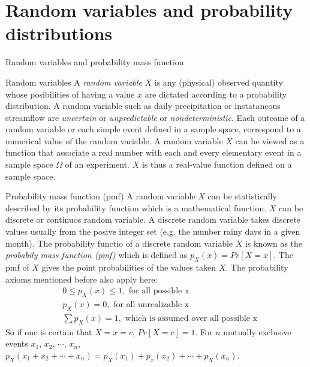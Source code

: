 \documentclass[8pt]{beamer}
\begin{document}
\section{Random variables and probability distributions}
\begin{frame}{Random variables and probability mass function}
    \begin{block}{Random variables}
        A \emph{random variable} $X$ is any (physical) observed quantity whose posibilities of having a value $x$ are dictated according to a probability distribution. A random variable such as daily precipitation or instataneous streamflow are \emph{uncertain} or \emph{unpredictable} or \emph{nondeterministic}. Each outcome of a random variable or each simple event defined in a sample space, correspond to a numerical value of the random variable. A random variable $X$ can be viewed as a function that associate a real number with each and every elementary event in a sample space $\Omega$ of an experiment. $X$ is thus a real-value function defined on a sample space.  
    \end{block}
    
    \begin{block}{Probability mass function (pmf)}
        A random variable $X$ can be statistically described by its probability function which is a mathematical function. $X$ can be discrete or continuos random variable. A discrete random variable takes discrete values usually from the posive integer set (e.g. the number rainy days in a given month). The probability functio of a discrete random variable $X$ is known as the \emph{probabily mass function (pmf)} which is defined as $p_X (x) = Pr[X = x]$. The pmf of $X$ gives the point probabilities of the values taken $X$. The probability axioms mentioned before also apply here:
        \vspace{-6pt}
        \begin{align*}
            & 0 \leq p_X (x) \leq 1, \text{   for all possible x}\\
            & p_X (x) = 0, \text{   for all unrealizable x} \\
            & \sum p_X (x) = 1, \text{   which is assumed over all possible x}
        \end{align*}
    So if one is certain that $X = x = c$, $Pr[X = c] = 1$. For $n$ mutually exclusive events $x_1$, $x_2$, $\cdots$, $x_n$, $p_X (x_1 + x_2 + \cdots + x_n) = p_X (x_1) + p_x(x_2) + \cdots + p_X (x_n)$.
    \end{block}
\end{frame}
\end{document}
